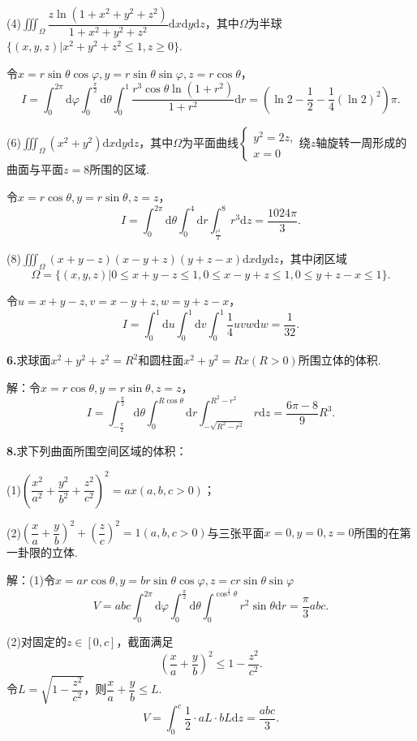 \documentclass[12pt, a4paper]{article}
\newcommand{\dif}{\mathrm{d}}
\begin{document}
(4)\(\iiint_\Omega \dfrac{z\ln(1 + x^2 + y^2 + z^2)}{1 + x^2 + y^2 + z^2} \dif x \dif y \dif z\)，其中\(\Omega\)为半球\(\{(x, y, z)|x^2 + y^2 + z^2 \leq 1, z \geq 0\}\).

令\(x = r\sin\theta\cos\varphi, y = r\sin\theta\sin\varphi, z = r\cos\theta\)，
\[I = \int_{0}^{2\pi} \dif \varphi \int_{0}^{\frac{\pi}{2}} \dif \theta \int_0^1 \frac{r^3\cos\theta \ln(1 + r^2)}{1 + r^2} \dif r = \left(\ln 2 - \frac{1}{2} - \frac{1}{4}(\ln 2)^2\right)\pi.\]

(6)\(\iiint_\Omega (x^2 + y^2) \dif x \dif y \dif z\)，其中\(\Omega\)为平面曲线\(\begin{cases}
y^2 = 2z, \\
x = 0
\end{cases}\)绕\(z\)轴旋转一周形成的曲面与平面\(z = 8\)所围的区域.

令\(x = r\cos\theta, y = r\sin\theta, z = z\)，
\[I = \int_{0}^{2\pi} \dif \theta \int_0^4 \dif r \int_{\frac{r^2}{2}}^{8} r^3 \dif z = \frac{1024\pi}{3}.\]

(8)\(\iiint_\Omega (x + y - z)(x - y + z)(y + z - x) \dif x \dif y \dif z\)，其中闭区域
\[\Omega = \{(x, y, z)|0 \leq x + y - z \leq 1, 0 \leq x - y + z \leq 1, 0 \leq y + z - x \leq 1\}.\]

令\(u = x + y - z, v = x - y + z, w = y + z - x\)，
\[I = \int_0^1 \dif u \int_0^1 \dif v \int_0^1 \frac{1}{4} uvw \dif w = \frac{1}{32}.\]

\textbf{6.}求球面\(x^2 + y^2 + z^2 = R^2\)和圆柱面\(x^2 + y^2 = Rx(R > 0)\)所围立体的体积.

解：令\(x = r\cos\theta, y = r\sin\theta, z = z\)，
\[I = \int_{-\frac{\pi}{2}}^{\frac{\pi}{2}} \dif \theta \int_{0}^{R\cos\theta} \dif r \int_{-\sqrt{R^2 - r^2}}^{R^2 - r^2} r \dif z = \frac{6\pi - 8}{9}R^3.\]

\textbf{8.}求下列曲面所围空间区域的体积：

(1)\(\left(\dfrac{x^2}{a^2} + \dfrac{y^2}{b^2} + \dfrac{z^2}{c^2}\right)^2 = ax(a, b, c > 0)\)；

(2)\(\left(\dfrac{x}{a} + \dfrac{y}{b}\right)^2 + \left(\dfrac{z}{c}\right)^2 = 1(a, b, c > 0)\)与三张平面\(x = 0, y = 0, z = 0\)所围的在第一卦限的立体.    

解：(1)令\(x = ar\cos\theta, y = br\sin\theta\cos\varphi, z = cr\sin\theta\sin\varphi\)
\[V = abc\int_{0}^{2\pi} \dif \varphi \int_{0}^{\frac{\pi}{2}} \dif \theta \int_{0}^{\cos^{\frac{1}{3}}\theta} r^2\sin\theta \dif r = \frac{\pi}{3}abc.\]

(2)对固定的\(z \in [0, c]\)，截面满足
\[\left(\frac{x}{a} + \frac{y}{b}\right)^2 \leq 1 - \frac{z^2}{c^2}.\]
令\(L = \sqrt{1 - \dfrac{z^2}{c^2}}\)，则\(\dfrac{x}{a} + \dfrac{y}{b} \leq L\).
\[V = \int_0^c \frac{1}{2} \cdot aL \cdot bL \dif z = \frac{abc}{3}.\]
\end{document}
